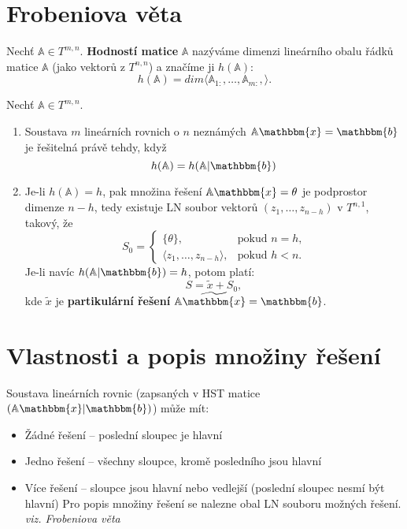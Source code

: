 \documentclass{szzclass}
\begin{document}
\section{Frobeniova věta}
\begin{definition}
Nechť $\mathbb{A}\in T^{m,n}$. \textbf{Hodností matice} $\mathbb{A}$ nazýváme dimenzi lineárního obalu řádků matice $\mathbb{A}$ (jako vektorů z $T^{n,n}$) a značíme ji $h(\mathbb{A})$:
\begin{equation}
  h(\mathbb{A})=dim\langle \mathbb{A}_{1:},\dots,\mathbb{A}_{m:},\rangle.
\end{equation}
\end{definition}

\begin{theorem}
Nechť $\mathbb{A}\in T^{m,n}$.
\begin{enumerate}
\item Soustava $m$ lineárních rovnich o $n$ neznámých $\mathbb{A} \mathbbm{x}=\mathbbm{b}$ je řešitelná právě tehdy, když
$$
h(\mathbb{A})=h(\mathbb{A} | \mathbbm{b})
$$
\item Je-li $h(\mathbb{A})=h$, pak množina řešení $\mathbb{A} \mathbbm{x}=\theta$ je podprostor dimenze $n-h$, tedy existuje LN soubor vektorů $(z_1,\dots,z_{n-h})$ v $T^{n,1}$, takový, že
$$ S_0=\begin{cases}
       \{\theta\}, & \text{pokud $n=h$,} \\
       \langle z_1,\dots,z_{n-h}\rangle, & \text{pokud $h<n$.}
       \end{cases}
$$
Je-li navíc $h(\mathbb{A}|\mathbbm{b})=h$, potom platí:
$$
S=\widetilde{x} + S_0,
$$ kde $\widetilde{x}$ je \textbf{partikulární řešení} $\mathbb{A} \widetilde{\mathbbm{x}}=\mathbbm{b}$.
\end{enumerate}
\end{theorem}

\section{Vlastnosti a popis množiny řešení}
Soustava lineárních rovnic (zapsaných v HST matice $(\mathbb{A}\mathbbm{x}|\mathbbm{b})$) může mít:
\begin{itemize}
\item Žádné řešení -- poslední sloupec je hlavní
\item Jedno řešení -- všechny sloupce, kromě posledního jsou hlavní
\item Více řešení -- sloupce jsou hlavní nebo vedlejší (poslední sloupec nesmí být hlavní)
Pro popis množiny řešení se nalezne obal LN souboru možných řešení. \emph{viz. Frobeniova věta}
\end{itemize}
\end{document}
